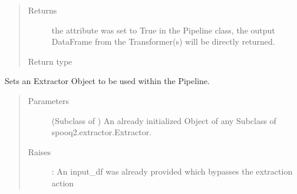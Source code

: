 \documentclass[a4paper,10pt, twoside,english]{sphinxmanual}
\begin{document}
\begin{fulllineitems}
\begin{fulllineitems}
\begin{quote}
\begin{description}
\item[{Returns}] \leavevmode
{} \textendash{}  the  attribute was set to True in the Pipeline class,
the output DataFrame from the Transformer(s) will be directly returned.

\item[{Return type}] \leavevmode
{}

\end{description}\end{quote}

\end{fulllineitems}


\begin{fulllineitems}
\label{\detokenize{pipeline/pipeline:spooq2.pipeline.pipeline.Pipeline.set_extractor}}
Sets an Extractor Object to be used within the Pipeline.
\begin{quote}\begin{description}
\item[{Parameters}] \leavevmode
{} (Subclass of ) \textendash{} An already initialized Object of any Subclass of spooq2.extractor.Extractor.

\item[{Raises}] \leavevmode
{}: \textendash{} An input\_df was already provided which bypasses the extraction action

\end{description}\end{quote}

\end{fulllineitems}



\end{fulllineitems}
\end{document}
